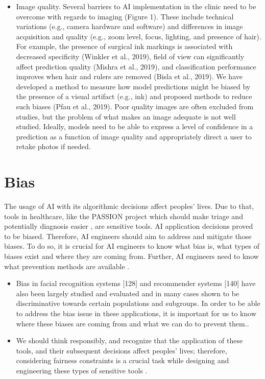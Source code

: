 \documentclass[12pt, a4paper, oneside]{book}   	%
\newif\ifrawcitationactive
\newcommand{\rawcitationend}{\color{black}\rawcitationactivefalse}
\newcommand{\rawcitationusedstart}{\color{violet}}
\newcommand{\rawcitationusedend}{%
	\ifrawcitationactive
	\color{purple}  %
	\else
	\color{black}  %
	\fi
}
\begin{document}
\begin{itemize}
					\item Image quality. Several barriers to AI implementation in the clinic need to be overcome with regards to imaging (Figure 1). These include technical variations (e.g., camera hardware and software) and differences in image acquisition and quality (e.g., zoom level, focus, lighting, and presence of hair). For example, the presence of surgical ink markings is associated with decreased specificity (Winkler et al., 2019), field of view can significantly affect prediction quality (Mishra et al., 2019), and classification performance improves when hair and rulers are removed (Bisla et al., 2019). We have developed a method to measure how model predictions might be biased by the presence of a visual artifact (e.g., ink) and proposed methods to reduce such biases (Pfau et al., 2019). Poor quality images are often excluded from studies, but the problem of what makes an image adequate is not well studied. Ideally, models need to be able to express a level of confidence in a prediction as a function of image quality and appropriately direct a user to retake photos if needed. \autocite{Young_2020}
				\end{itemize}
				\rawcitationend
		
		
		\section{Bias}
		The usage of AI with its algorithmic decisions affect peoples' lives. Due to that, tools in healthcare, like the PASSION project which should make triage and potentially diagnosis easier \autocite{Gottfrois2024}, are sensitive tools. AI application decisions proved to be biased. Therefore, AI engineers should aim to address and mitigate those biases. To do so, it is crucial for AI engineers to know what bias is, what types of biases exist and where they are coming from. Further, AI engineers need to know what prevention methods are available \autocite{Mehrabi_2021}.
			
		\rawcitationusedstart
		\begin{itemize}
			\item Bias in facial recognition systems [128] and recommender systems [140] have also been largely studied and evaluated and in many cases shown to be discriminative towards certain populations and subgroups. In order to be able to address the bias issue in these applications, it is important for us to know where these biases are coming from and what we can do to prevent them.\autocite{Mehrabi_2021}.
			\item We should think responsibly, and recognize that the application of these tools, and their subsequent decisions affect peoples’ lives; therefore, considering fairness constraints is a crucial task while designing and engineering these types of sensitive tools \autocite{Mehrabi_2021}.
		\end{itemize}
		\rawcitationusedend
		
\end{document}

